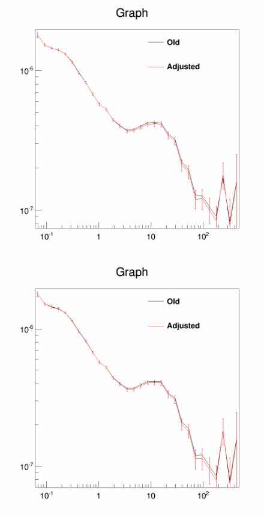 \begin{figure}[H]
\begin{minipage}[h]{0.45\textwidth}
  	\subcaption{}
  	\label{app:app_iso_process_2}
  \end{minipage}
  \hfill
  \begin{minipage}[h]{0.45\textwidth}
  	\centering
	\includegraphics[width=1\linewidth]{pic/method/app_iso_process_3.png}
 	\subcaption{}
  	\label{app:app_iso_process_3}
  \end{minipage}
  \hfill
  \begin{minipage}[h]{0.45\textwidth}
  	\centering
	\includegraphics[width=1\linewidth]{pic/method/app_iso_process_4.png}

\end{minipage}
\end{figure}
